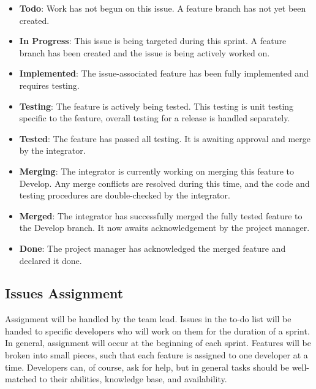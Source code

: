 \begin{itemize}
\item \textbf{Todo}: Work has not begun on this issue. A feature branch has not yet been created.

\item \textbf{In Progress}: This issue is being targeted during this sprint. A feature branch has been created and the issue is being actively worked on.

\item \textbf{Implemented}: The issue-associated feature has been fully implemented and requires testing.

\item \textbf{Testing}: The feature is actively being tested. This testing is unit testing specific to the feature, overall testing for a release is handled separately.

\item \textbf{Tested}: The feature has passed all testing. It is awaiting approval and merge by the integrator.

\item \textbf{Merging}: The integrator is currently working on merging this feature to Develop. Any merge conflicts are resolved during this time, and the code and testing procedures are double-checked by the integrator.

\item \textbf{Merged}: The integrator has successfully merged the fully tested feature to the Develop branch. It now awaits acknowledgement by the project manager.

\item \textbf{Done}: The project manager has acknowledged the merged feature and declared it done.

\end{itemize}

\subsection{Issues Assignment}

Assignment will be handled by the team lead. Issues in the to-do list will be handed to specific developers who will work on them for the duration of a sprint. In general, assignment will occur at the beginning of each sprint. Features will be broken into small pieces, such that each feature is assigned to one developer at a time. Developers can, of course, ask for help, but in general tasks should be well-matched to their abilities, knowledge base, and availability.


